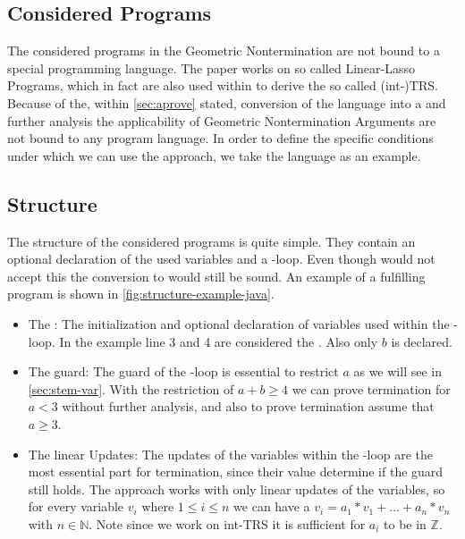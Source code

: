 \subsection{Considered Programs}
The considered programs in the Geometric Nontermination are not bound to a special programming language. The paper works on so called Linear-Lasso Programs, which in fact %
are also used within \aprove to derive the so called (int-)TRS. Because of the, within \autoref{sec:aprove} stated, conversion of the language into a \seg and further analysis the applicability of Geometric Nontermination Arguments are not bound to any program language. \newline
In order to define the specific conditions under which we can use the approach, we take the language  as an example.
\subsection{Structure}
\label{sec:structure}
The structure of the considered programs is quite simple. They contain an optional declaration of the used variables and a -loop. Even though  would not accept this the conversion to  would still be sound. An example of a fulfilling  program is shown in \autoref{fig:structure-example-java}. 
\begin{itemize}
	\item The \stem: \newline
		The initialization and optional declaration of variables used within the -loop. In the example line 3 and 4 are considered the \stem. Also only $b$ is declared.
	\item The guard: \newline
		The guard of the -loop is essential to restrict $a$  as we will see in \autoref{sec:stem-var}. With the restriction of $a+b\ge 4 $ we can prove termination for $a < 3$ without further analysis, and also to prove termination assume that $a \ge 3$.
	\item The linear Updates: \newline
		The updates of the variables within the -loop are the most essential part for termination, since their value determine if the guard still holds. The approach works with only linear updates of the variables, so for every variable $v_i$ where $1\le i\le n$ we can have a $v_i=a_1*v_1+...+a_n*v_n$ with $n \in \mathbb{N}$. Note since we work on int-TRS it is sufficient for $a_i$ to be in $\mathbb{Z}$. 	
\end{itemize} 

